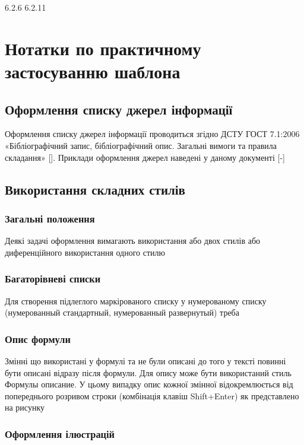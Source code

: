 6.2.6
6.2.11

\section{Нотатки по практичному застосуванню шаблона}
\subsection{Оформлення списку джерел інформації}

Оформлення списку джерел інформації проводиться згідно ДСТУ ГОСТ 7.1:2006 «Бібліографічний запис, бібліографічний опис. Загальні вимоги та правила складання» []. Приклади оформлення джерел наведені у даному документі [-]

\subsection{Використання складних стилів}
\subsubsection{Загальні положення}

Деякі задачі оформлення вимагають використання або двох стилів або диференційного використання одного стилю

\subsubsection{Багаторівневі списки}

Для створення підлеглого маркірованого списку у нумерованому списку (нумерованный стандартный, нумерованный развернутый) треба 

\subsubsection{Опис формули}

Змінні що використані у формулі та не були описані до того у тексті повинні бути описані відразу після формули. Для опису може бути використаний стиль Формулы описание. У цьому випадку опис кожної змінної відокремлюється від попереднього розривом строки (комбінація клавіш Shift+Enter) як представлено на рисунку

\subsubsection{Оформлення ілюстрацій}


